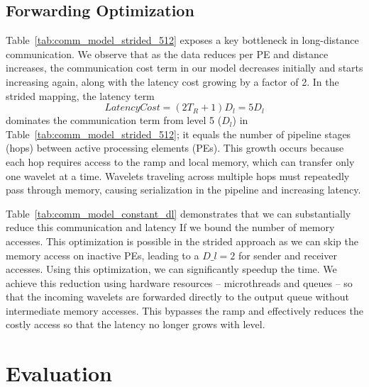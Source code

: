 \documentclass[conference]{IEEEtran}
\begin{document}
        \subsection{Forwarding Optimization} \label{sec:forwarding}
            Table~\ref{tab:comm_model_strided_512} exposes a key bottleneck in long-distance communication.  We observe that as the data reduces per PE and distance increases, the communication cost term in our model decreases initially and starts increasing again, along with the latency cost growing by a factor of 2.
            In the strided mapping, the latency term
            \begin{equation}\label{equation:latency}
                LatencyCost = (2T_R + 1)D_l = 5D_l
            \end{equation}
            dominates the communication term from level 5 (\(D_l\)) in Table~\ref{tab:comm_model_strided_512}; it equals the number of pipeline stages (hops) between active processing elements (PEs). This growth occurs because each hop requires access to the ramp and local memory, which can transfer only one wavelet at a time. Wavelets traveling across multiple hops must repeatedly pass through memory, causing serialization in the pipeline and increasing latency.

            Table~\ref{tab:comm_model_constant_dl} demonstrates
            that we can substantially reduce this communication and latency
            If we bound the number of memory accesses.  This optimization is possible in the strided approach as we can skip the memory access on inactive PEs, leading to a \(D\_l = 2\) for sender and receiver accesses. Using this optimization, we can significantly speedup the time. We achieve this reduction using hardware resources -- microthreads and queues -- so that the incoming wavelets are forwarded directly to the output queue without intermediate memory accesses. This bypasses the ramp and effectively reduces the costly access so that the latency no longer grows with level. %



    \section{Evaluation}

\end{document}
